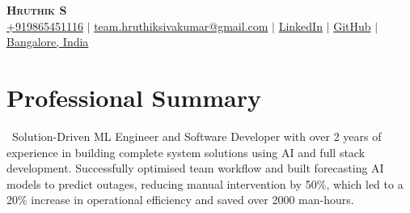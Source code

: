 \documentclass[letterpaper,11pt]{article}
\begin{document}

\begin{center}
    \textbf{\Huge \scshape Hruthik S} \\ \vspace{3pt}
    \small
    \faMobile \hspace{.5pt} \href{tel:+919865451116}{+919865451116}
    $|$
    \faAt \hspace{.5pt} \href{mailto:team.hruthiksivakumar@gmail.com}{team.hruthiksivakumar@gmail.com}
    $|$
    \faLinkedinSquare \hspace{.5pt} \href{https://www.linkedin.com/in/hruthiksivakumar/}{LinkedIn}
    $|$
    \faGithub \hspace{.5pt} \href{https://github.com/hruthiksiva}{GitHub}
    $|$
    \faMapMarker \hspace{.5pt} \href{https://www.google.com/maps/place/Bogazici+University+North+Campus/@41.0863067,29.0441352,15z/data=!4m5!3m4!1s0x0:0x9d2497b07c8edb2f!8m2!3d41.0863067!4d29.0441352}{Bangalore, India}
\end{center}


\section{Professional Summary}
    \vspace{3pt}
        \ Solution-Driven ML Engineer and Software Developer with over 2 years of experience in building complete system solutions using AI and full stack development. Successfully optimised team workflow and built forecasting AI models to predict outages, reducing manual intervention by 50\%, which led to a 20\% increase in operational efficiency and saved over 2000 man-hours. 




\end{document}
